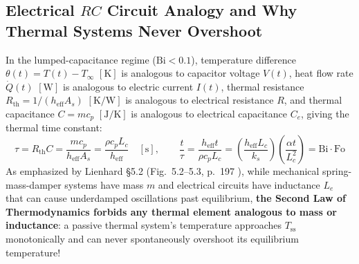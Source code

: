 \subsection{Electrical $RC$ Circuit Analogy and Why Thermal Systems Never Overshoot}
In the lumped-capacitance regime ($\mathrm{Bi} < 0.1$), temperature difference $\theta(t) = T(t) - T_\infty$ $[\si{\kelvin}]$ is analogous to capacitor voltage $V(t)$, heat flow rate $\dot{Q}(t)$ $[\si{\watt}]$ is analogous to electric current $I(t)$, thermal resistance $R_{\mathrm{th}} = 1/(h_{\mathrm{eff}}A_s)$ $[\si{\kelvin\per\watt}]$ is analogous to electrical resistance $R$, and thermal capacitance $C = m c_p$ $[\si{\joule\per\kelvin}]$ is analogous to electrical capacitance $C_e$, giving the thermal time constant:
\begin{equation}
  \tau = R_{\mathrm{th}} C = \frac{m c_p}{h_{\mathrm{eff}} A_s} = \frac{\rho c_p L_c}{h_{\mathrm{eff}}} \quad [\si{\second}], \qquad \frac{t}{\tau} = \frac{h_{\mathrm{eff}} t}{\rho c_p L_c} = \left(\frac{h_{\mathrm{eff}} L_c}{k_s}\right)\!\left(\frac{\alpha t}{L_c^2}\right) = \mathrm{Bi}\cdot\mathrm{Fo}
  \label{eq:13:tau-bifo}
\end{equation}
As emphasized by Lienhard §5.2 (Fig.~5.2--5.3, p.~197 ), while mechanical spring-mass-damper systems have mass $m$ and electrical circuits have inductance $L_e$ that can cause underdamped oscillations past equilibrium, \textbf{the Second Law of Thermodynamics forbids any thermal element analogous to mass or inductance}: a passive thermal system's temperature approaches $T_{\mathrm{ss}}$ monotonically and can never spontaneously overshoot its equilibrium temperature!

